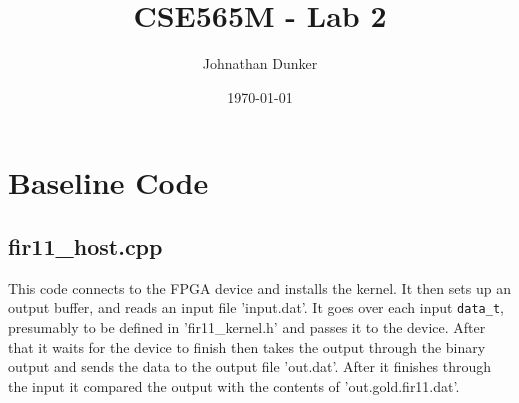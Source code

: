 \documentclass[11pt]{article}
\title{CSE565M - Lab 2}
\author{Johnathan Dunker}
\date{\today}
\begin{document}
\maketitle

\section{Baseline Code}
\subsection{fir11\_host.cpp}
This code connects to the FPGA device and installs the kernel. It then sets up an output buffer, and reads an input file 'input.dat'. It goes over each input \texttt{data\_t}, presumably to be defined in 'fir11\_kernel.h' and passes it to the device. After that it waits for the device to finish then takes the output through the binary output and sends the data to the output file 'out.dat'. After it finishes through the input it compared the output with the contents of 'out.gold.fir11.dat'.
\end{document}
